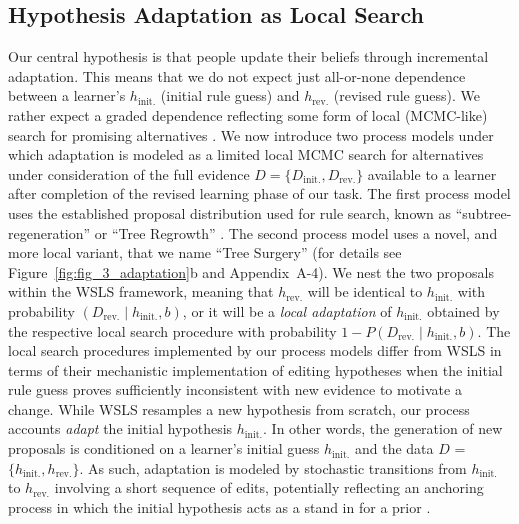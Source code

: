 \documentclass[doc,natbib,floatsintext]{apa7}
\newcommand{\dr}{D_{\mathrm{rev.}}}%
\newcommand{\di}{D_{\mathrm{init.}}}%
\newcommand{\hr}{h_{\mathrm{rev.}}}
\newcommand{\hi}{h_{\mathrm{init.}}}
\begin{document}
\subsection{Hypothesis Adaptation as Local Search}

Our central hypothesis is that people update their beliefs through incremental adaptation. This means that we do not expect just all-or-none dependence between a learner's $\hi$ (initial rule guess) and $\hr$ (revised rule guess). We rather expect a graded dependence reflecting some form of local (MCMC-like) search for promising alternatives \citep{bramley2017formalizing}. We now introduce two process models under which adaptation is modeled as a limited local MCMC search for alternatives under consideration of the full evidence $D = \{\di,\dr\}$ available to a learner after completion of the revised learning phase of our task. The first process model uses the established proposal distribution used for rule search, known as ``subtree-regeneration'' or ``Tree Regrowth'' \citep{goodman2008rational}. The second process model uses a novel, and more local variant, that we name ``Tree Surgery'' (for details see Figure~\ref{fig:fig_3_adaptation}b and Appendix~A-4). We nest the two proposals within the WSLS framework, meaning that $\hr$ will be identical to $\hi$ with probability $(\dr\mid \hi,b)$, or it will be a \textit{local adaptation} of $\hi$ obtained by the respective local search procedure with probability $1 - P(\dr \mid \hi, b)$. The local search procedures implemented by our process models differ from WSLS in terms of their mechanistic implementation of editing hypotheses when the initial rule guess proves sufficiently inconsistent with new evidence to motivate a change. While WSLS resamples a new hypothesis from scratch, our process accounts \textit{adapt} the initial hypothesis \(\hi\). In other words, the generation of new proposals is conditioned on a learner's initial guess \(\hi\) and the data $D$ = $\{\hi,\hr\}$. As such, adaptation is modeled by stochastic transitions from \(\hi\) to \(\hr\) involving a short sequence of edits, potentially reflecting an anchoring process in which the initial hypothesis acts as a stand in for a prior \citep{bramley2017formalizing}. 
\end{document}
